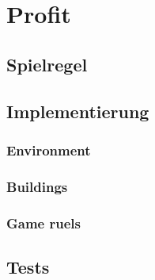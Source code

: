 \section{Profit}

\subsection{Spielregel}


\subsection{Implementierung}

\subsubsection{Environment}
\subsubsection{Buildings}
\subsubsection{Game ruels}



\subsection{Tests}